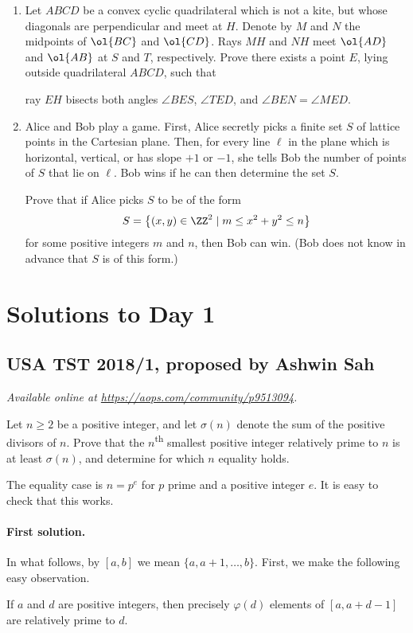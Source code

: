 \documentclass[11pt]{scrartcl}
\begin{document}
\begin{enumerate}[\bfseries 1.]
\item %
Let $ABCD$ be a convex cyclic quadrilateral which is not a kite,
but whose diagonals are perpendicular and meet at $H$.
Denote by $M$ and $N$ the midpoints of $\ol{BC}$ and $\ol{CD}$.
Rays $MH$ and $NH$ meet $\ol{AD}$ and $\ol{AB}$ at $S$ and $T$, respectively.
Prove there exists a point $E$, lying outside quadrilateral $ABCD$,
such that
\begin{itemize}
  \ii ray $EH$ bisects both angles $\angle BES$, $\angle TED$, and
  \ii $\angle BEN = \angle MED$.
\end{itemize}

\item %
Alice and Bob play a game.
First, Alice secretly picks a finite set $S$
of lattice points in the Cartesian plane.
Then, for every line $\ell$ in the plane
which is horizontal, vertical, or has slope $+1$ or $-1$,
she tells Bob the number of points of $S$ that lie on $\ell$.
Bob wins if he can then determine the set $S$.

Prove that if Alice picks $S$ to be of the form
\[ S = \left\{ (x,y) \in \ZZ^2 \mid m \le x^2+y^2 \le n \right\} \]
for some positive integers $m$ and $n$, then Bob can win.
(Bob does not know in advance that $S$ is of this form.)

\end{enumerate}
\pagebreak

\section{Solutions to Day 1}
\subsection{USA TST 2018/1, proposed by Ashwin Sah}
\textsl{Available online at \url{https://aops.com/community/p9513094}.}
\begin{mdframed}[style=mdpurplebox,frametitle={Problem statement}]
Let $n \ge 2$ be a positive integer,
and let $\sigma(n)$ denote the sum of the positive divisors of $n$.
Prove that the $n$\textsuperscript{th} smallest positive integer
relatively prime to $n$ is at least $\sigma(n)$,
and determine for which $n$ equality holds.
\end{mdframed}
The equality case is $n = p^e$ for
$p$ prime and a positive integer $e$.
It is easy to check that this works.

\bigskip

\paragraph{First solution.}
In what follows, by $[a,b]$ we mean $\{a,a+1,\dots,b\}$.
First, we make the following easy observation.
\begin{claim*}
  If $a$ and $d$ are positive integers,
  then precisely $\varphi(d)$ elements
  of $[a, a + d - 1]$ are relatively prime to $d$.
\end{claim*}
\end{document}
